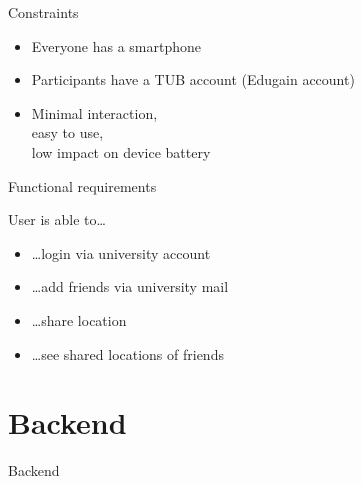 \documentclass[11pt]{beamer}
\begin{document}
\begin{frame}{Constraints}

  \begin{itemize}

    \item Everyone has a smartphone
  	\item Participants have a TUB account (Edugain account)
  	\item Minimal interaction,\\easy to use,\\low impact on device battery

  \end{itemize}

\end{frame}


\begin{frame}{Functional requirements}

  User is able to\ldots

  \vspace{0.25cm}

  \begin{itemize}
    \item \ldots login via university account
    \item \ldots add friends via university mail
    \item \ldots share location
    \item \ldots see shared locations of friends
  \end{itemize}

\end{frame}


\section{Backend}

\begin{frame}{}

  \begin{center}

    {\Huge Backend}

  \end{center}

\end{frame}
\end{document}
